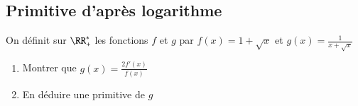 \documentclass[oneside,12pt]{article}          %
\begin{document}
\subsection{Primitive d'après logarithme}
On définit sur $\RR_+^*$ les fonctions $f$ et $g$ par $f(x)=1+\sqrt{x}$ et $g(x)=\frac{1}{x+\sqrt{x}}$
\begin{enumerate}
	\item Montrer que $g(x)=\frac{2f'(x)}{f(x)}$
	\item En déduire une primitive de $g$
\end{enumerate}
\end{document}
